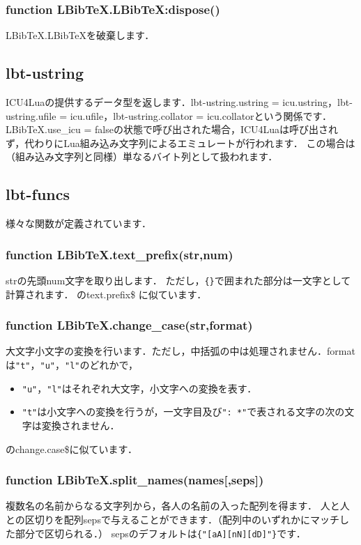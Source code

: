 \documentclass[a4paper]{ltjsarticle}
\begin{document}
\subsubsection{function LBibTeX.LBibTeX:dispose()}
LBibTeX.LBibTeXを破棄します．

\subsection{lbt-ustring}
ICU4Luaの提供するデータ型を返します．lbt-ustring.ustring = icu.ustring，lbt-ustring.ufile = icu.ufile，lbt-ustring.collator = icu.collatorという関係です．
LBibTeX.use\_icu = falseの状態で呼び出された場合，ICU4Luaは呼び出されず，代わりにLua組み込み文字列によるエミュレートが行われます．
この場合は（組み込み文字列と同様）単なるバイト列として扱われます．

\subsection{lbt-funcs}
様々な関数が定義されています．
\subsubsection{function LBibTeX.text\_prefix(str,num)}
strの先頭num文字を取り出します．
ただし，\verb|{}|で囲まれた部分は一文字として計算されます．
\BibTeX のtext.prefix\$ に似ています．

\subsubsection{function LBibTeX.change\_case(str,format)}
大文字小文字の変換を行います．ただし，中括弧の中は処理されません．formatは\verb|"t"|，\verb|"u"|，\verb|"l"|のどれかで，
\begin{itemize}
\item \verb|"u"|，\verb|"l"|はそれぞれ大文字，小文字への変換を表す．
\item \verb|"t"|は小文字への変換を行うが，一文字目及び\verb|": *"|で表される文字の次の文字は変換されません．
\end{itemize}
\BibTeX のchange.case\$に似ています．

\subsubsection{function LBibTeX.split\_names(names[,seps])}
複数名の名前からなる文字列から，各人の名前の入った配列を得ます．
人と人との区切りを配列sepsで与えることができます．（配列中のいずれかにマッチした部分で区切られる．）
sepsのデフォルトは\verb|{"[aA][nN][dD]"}|です．
\end{document}
